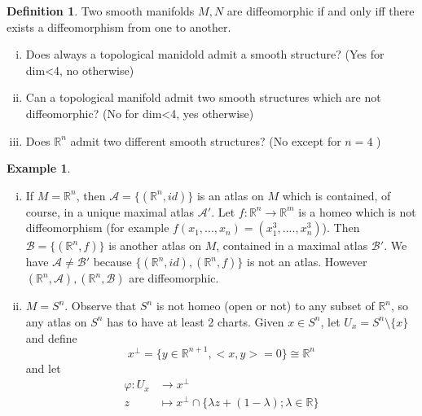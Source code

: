 \documentclass[]{book}
\theoremstyle{definition}
\newtheorem{defin}{Definition}[section]
\theoremstyle{definition}
\theoremstyle{definition}
\theoremstyle{definition}
\theoremstyle{definition}
\theoremstyle{definition}
\theoremstyle{definition}
\theoremstyle{definition}
\theoremstyle{definition}
\newtheorem{ex}{Example}
\theoremstyle{definition}
\theoremstyle{definition}
\newcommand{\R}{\mathbb{R}}
\begin{document}
\begin{defin}
  Two smooth manifolds $M,N$ are diffeomorphic if and only iff there exists a diffeomorphism from
  one to another.
\end{defin}

\begin{enumerate}[i)]
  \item Does always a topological manidold admit a smooth structure? (Yes for dim<4, no otherwise)
  \item Can a topological manifold admit two smooth structures which are not diffeomorphic? (No for
    dim<4, yes otherwise)
  \item Does  $\R^{n}$ admit two different smooth structures? (No except for $n=4$ )
\end{enumerate}

\begin{ex}
  \begin{enumerate}[i)]
    \item If $M=\R^{n}$, then $\mathcal{A}=\lbrace (\R^{n},id) \rbrace $ is an atlas on $M$ which is
      contained, of course, in a unique maximal atlas $\mathcal{A'}$. Let $f: \R^{n} \longrightarrow
      \R^{m}$ is a homeo which is not diffeomorphism
    (for example $f(x_1,...,x_{n})=(x_1^3,....,x_{n}^3)$). Then $\mathcal{B}=\lbrace (\R^{n},f)
    \rbrace $ is another atlas on $M$, contained in a maximal atlas $\mathcal{B'}$. 
    We have $\mathcal{A}\neq\mathcal{B'}$ because $\lbrace (\R^{n},id),(\R^{n},f) \rbrace $ is not
    an atlas. However $(\R^{n},\mathcal{A}),(\R^{n},\mathcal{B})$ are diffeomorphic.

  \item $M=S^{n}$. Observe that $S^{n}$ is not homeo (open or not) to any subset of $\R^{n}$, so any
      atlas on $S^{n}$ has to have at least 2 charts. Given $x\in S^{n}$, let
      $U_{x}=S^{n}\setminus \lbrace x \rbrace $ and define 
      \[
      x^{\perp}=\lbrace y\in \R^{n+1}, <x,y>=0 \rbrace \cong \R^{n}
      \] 
      and let
      \begin{align*}
        \varphi: U_x &\longrightarrow x^{\perp}\\
        z &\longmapsto x^{\perp} \cap \lbrace \lambda z + (1-\lambda);\lambda\in\R \rbrace 
      \end{align*}
      \begin{center}
      \end{center} 
  \end{enumerate}
\end{ex}
\end{document}
